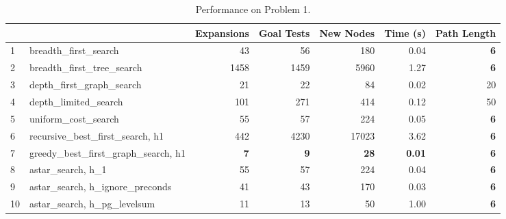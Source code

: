 \documentclass{article}
\theoremstyle{plain}
\theoremstyle{definition}
\theoremstyle{remark}
\begin{document}
\begin{table}[h]
\centering
\caption{Performance on Problem 1.}
\label{table-performance1}
\begin{tabular}{llrrrrr}
   & \multicolumn{1}{l|}{}                                           & Expansions & Goal Tests & New Nodes   & Time (s)      & Path Length \\ \hline
1  & \multicolumn{1}{l|}{breadth\_first\_search}                     & 43         & 56         & 180         & 0.04          & \textbf{6}  \\
2  & \multicolumn{1}{l|}{breadth\_first\_tree\_search}               & 1458       & 1459       & 5960        & 1.27          & \textbf{6}  \\
3  & \multicolumn{1}{l|}{depth\_first\_graph\_search}                & 21         & 22         & 84          & 0.02          & 20          \\
4  & \multicolumn{1}{l|}{depth\_limited\_search}                     & 101        & 271        & 414         & 0.12          & 50          \\
5  & \multicolumn{1}{l|}{uniform\_cost\_search}                      & 55         & 57         & 224         & 0.05          & \textbf{6}  \\
6  & \multicolumn{1}{l|}{recursive\_best\_first\_search, h1}   & 442        & 4230       & 17023       & 3.62          & \textbf{6}  \\
7  & \multicolumn{1}{l|}{greedy\_best\_first\_graph\_search, h1} & \textbf{7} & \textbf{9} & \textbf{28} & \textbf{0.01} & \textbf{6}  \\
8  & \multicolumn{1}{l|}{astar\_search, h\_1}                    & 55         & 57         & 224         & 0.04          & \textbf{6}  \\
9  & \multicolumn{1}{l|}{astar\_search, h\_ignore\_preconds}     & 41         & 43         & 170         & 0.03          & \textbf{6}  \\
10 & \multicolumn{1}{l|}{astar\_search, h\_pg\_levelsum}        & 11         & 13         & 50          & 1.00          & \textbf{6} 
\end{tabular}

\bigskip
\bigskip


\end{table}
\end{document}

